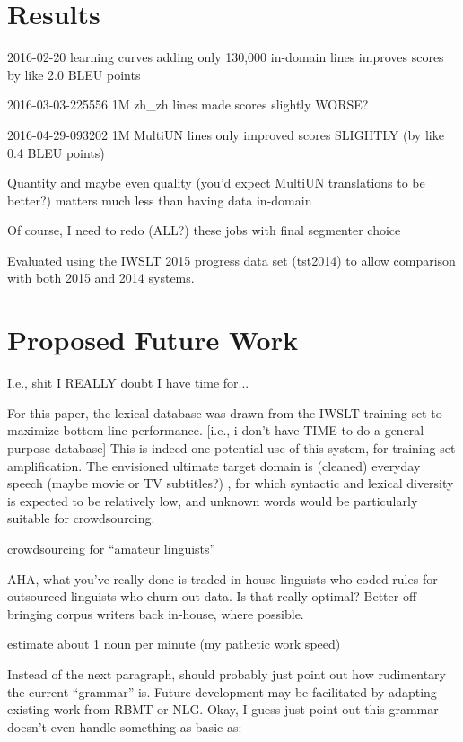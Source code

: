\section{Results}

2016-02-20 learning curves adding only 130,000 in-domain lines improves scores by like 2.0 BLEU points

2016-03-03-225556 1M zh\_zh lines made scores slightly WORSE?

2016-04-29-093202 1M MultiUN lines only improved scores SLIGHTLY (by like 0.4 BLEU points)

Quantity and maybe even quality (you'd expect MultiUN translations to be better?) matters much less than having data in-domain

Of course, I need to redo (ALL?) these jobs with final segmenter choice

Evaluated using the IWSLT 2015 progress data set (tst2014) to allow comparison with both 2015 and 2014 systems.


\section{Proposed Future Work}

I.e., shit I REALLY doubt I have time for...



For this paper, the lexical database was drawn from the IWSLT training set to maximize bottom-line performance.
[i.e., i don't have TIME to do a general-purpose database]
This is indeed one potential use of this system, for training set amplification.
The envisioned ultimate target domain is (cleaned) everyday speech (maybe movie or TV subtitles?) , for which syntactic and lexical diversity is expected to be relatively low, and unknown words would be particularly suitable for crowdsourcing.

crowdsourcing for ``amateur linguists''

AHA, what you've really done is traded in-house linguists who coded rules for outsourced linguists who churn out data.
Is that really optimal?
Better off bringing corpus writers back in-house, where possible.

estimate about 1 noun per minute (my pathetic work speed)


Instead of the next paragraph, should probably just point out how rudimentary the current ``grammar'' is. 
Future development may be facilitated by adapting existing work from RBMT or NLG. 
Okay, I guess just point out this grammar doesn't even handle something as basic as:

